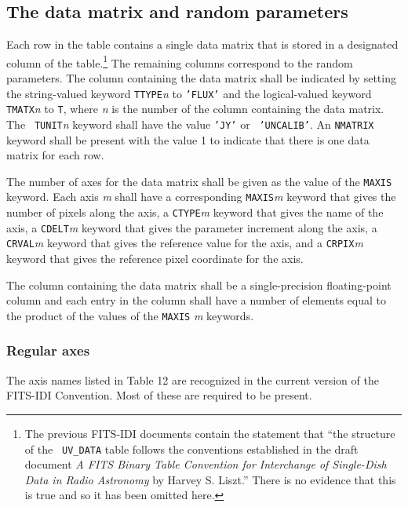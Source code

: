 \documentclass[twoside]{article}
\newcommand{\Hi}[1]{\textcolor{hicol}{#1}}
\begin{document}
\subsection{The data matrix and random parameters}

Each row in the table contains a single data matrix that is stored in
a designated column of the table.\footnote{\Hi{The previous FITS-IDI
  documents contain the statement that ``the structure of the {\tt
  UV\_DATA} table follows the conventions established in the draft
  document {\it A FITS Binary Table Convention for Interchange of
  Single-Dish Data in Radio Astronomy} by Harvey S. Liszt.''  There is
  no evidence that this is true and so it has been omitted here.}}
The remaining columns correspond to the random parameters.  The column
containing the data matrix shall be indicated by setting the
string-valued keyword {\tt TTYPE}{\it n} to {\tt 'FLUX'} and the
logical-valued keyword {\tt TMATX}{\it n} to {\tt T}, where {\it n} is
the number of the column containing the data matrix.  The {\tt
TUNIT}{\it n} keyword shall have the value {\tt 'JY'} or {\tt
  'UNCALIB'}\@.  An {\tt NMATRIX} keyword shall be present with the
value 1 to indicate that there is one data matrix for each row.

The number of axes for the data matrix shall be given as the value of
the {\tt MAXIS} keyword.  Each axis {\it m} shall have a corresponding
{\tt MAXIS}{\it m} keyword that gives the number of pixels along the
axis, a {\tt CTYPE}{\it m} keyword that gives the name of the axis,
a {\tt CDELT}{\it m} keyword that gives the parameter increment along
the axis, a {\tt CRVAL}{\it m} keyword that gives the reference value
for the axis, and a {\tt CRPIX}{\it m} keyword that gives the reference
pixel coordinate for the axis.

The column containing the data matrix shall be a single-precision
floating-point column and each entry in the column shall have a number
of elements equal to the product of the values of the {\tt MAXIS}{\it
  m} keywords.

\subsubsection{Regular axes}
\label{UVdata:regaxes}

The axis names listed in Table \Hi{12} are recognized in the current
version of the FITS-IDI \Hi{Convention}.  Most of these are required
to be present.
\end{document}

